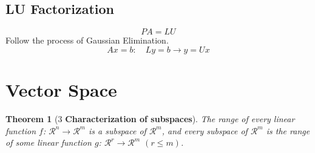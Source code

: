 \documentclass[]{article}
\newtheorem{theo}{Theorem}
\begin{document}
\subsection{LU Factorization}
$$PA=LU$$
{Follow the process of Gaussian Elimination.}
$$Ax=b: \quad Ly=b \rightarrow y=Ux$$
\pagebreak

\section{Vector Space}
\begin{theo}[3 \textbf{Characterization of subspaces}]
The range of every linear function $f$: $\mathcal{R}^n \to \mathcal{R}^m$ is a subspace of $\mathcal{R}^m$, and every subspace of $\mathcal{R}^m$ is the range of some linear function $g$: $\mathcal{R}^r \to \mathcal{R}^m$ $(r\leq m)$.
\end{theo}
\end{document}
